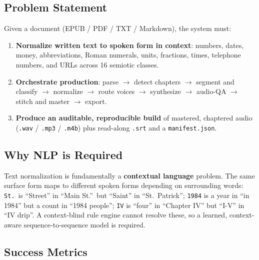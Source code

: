 \documentclass[12pt,a4paper]{article}
\begin{document}
\subsection{Problem Statement}

Given a document (EPUB / PDF / TXT / Markdown), the system must:
\begin{enumerate}
  \item \textbf{Normalize written text to spoken form in context}: numbers, dates, money, abbreviations, Roman numerals, units, fractions, times, telephone numbers, and URLs across 16 semiotic classes.
  \item \textbf{Orchestrate production}: parse $\rightarrow$ detect chapters $\rightarrow$ segment and classify $\rightarrow$ normalize $\rightarrow$ route voices $\rightarrow$ synthesize $\rightarrow$ audio-QA $\rightarrow$ stitch and master $\rightarrow$ export.
  \item \textbf{Produce an auditable, reproducible build} of mastered, chaptered audio (\texttt{.wav} / \texttt{.mp3} / \texttt{.m4b}) plus read-along \texttt{.srt} and a \texttt{manifest.json}.
\end{enumerate}

\subsection{Why NLP is Required}

Text normalization is fundamentally a \textbf{contextual language} problem. The same surface form maps to different spoken forms depending on surrounding words: \texttt{St.}\ is ``Street'' in ``Main St.''\ but ``Saint'' in ``St.\ Patrick''; \texttt{1984} is a year in ``in 1984'' but a count in ``1984 people''; \texttt{IV} is ``four'' in ``Chapter IV'' but ``I-V'' in ``IV drip''. A context-blind rule engine cannot resolve these, so a learned, context-aware sequence-to-sequence model is required.

\subsection{Success Metrics}
\end{document}
